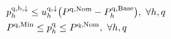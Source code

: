 \documentclass[conference]{IEEEtran}
\begin{document}
\begin{subequations}
\begin{align}
        \  & p^{\rm{q},\rm{b}, \downarrow}_{h} \leq u^{\rm{q},\downarrow}_{h} \big(P^{\rm{q},\rm{Nom}} -P^{\rm{q},\rm{Base}}_{h}\big), \                                                                                              \forall{h,q}                                                                             \label{power:10q}                                                                                                                                                                                                                            \\
        \  & P^{\rm{q},\rm{Min}} \leq p_{h}^{\rm{q}} \leq P^{\rm{q},\rm{Nom}}, \                                                                                                                                           \forall{h,q}                                                                             \label{power:11q}                                                                                                                                                                                                                                         \\

\end{align}
\end{subequations}
\end{document}
